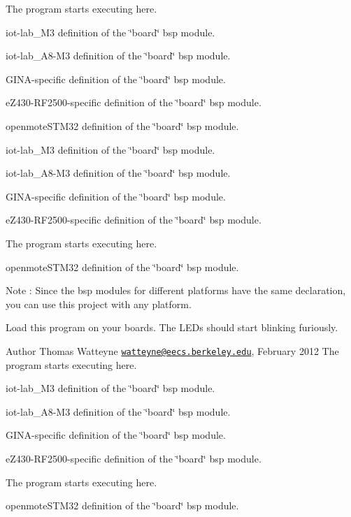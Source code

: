 The program starts executing here. 

iot-\/lab\+\_\+\+M3 definition of the \char`\"{}board\char`\"{} bsp module.

iot-\/lab\+\_\+\+A8-\/\+M3 definition of the \char`\"{}board\char`\"{} bsp module.

G\+I\+N\+A-\/specific definition of the \char`\"{}board\char`\"{} bsp module.

e\+Z430-\/\+R\+F2500-\/specific definition of the \char`\"{}board\char`\"{} bsp module.

openmote\+S\+T\+M32 definition of the \char`\"{}board\char`\"{} bsp module.

iot-\/lab\+\_\+\+M3 definition of the \char`\"{}board\char`\"{} bsp module.

iot-\/lab\+\_\+\+A8-\/\+M3 definition of the \char`\"{}board\char`\"{} bsp module.

G\+I\+N\+A-\/specific definition of the \char`\"{}board\char`\"{} bsp module.

e\+Z430-\/\+R\+F2500-\/specific definition of the \char`\"{}board\char`\"{} bsp module.

The program starts executing here.

openmote\+S\+T\+M32 definition of the \char`\"{}board\char`\"{} bsp module.

\begin{DoxyNote}{Note}
\+: Since the bsp modules for different platforms have the same declaration, you can use this project with any platform.
\end{DoxyNote}
Load this program on your boards. The L\+E\+Ds should start blinking furiously.

\begin{DoxyAuthor}{Author}
Thomas Watteyne \href{mailto:watteyne@eecs.berkeley.edu}{\tt watteyne@eecs.\+berkeley.\+edu}, February 2012 The program starts executing here.
\end{DoxyAuthor}
iot-\/lab\+\_\+\+M3 definition of the \char`\"{}board\char`\"{} bsp module.

iot-\/lab\+\_\+\+A8-\/\+M3 definition of the \char`\"{}board\char`\"{} bsp module.

G\+I\+N\+A-\/specific definition of the \char`\"{}board\char`\"{} bsp module.

e\+Z430-\/\+R\+F2500-\/specific definition of the \char`\"{}board\char`\"{} bsp module.

The program starts executing here.

openmote\+S\+T\+M32 definition of the \char`\"{}board\char`\"{} bsp module.

